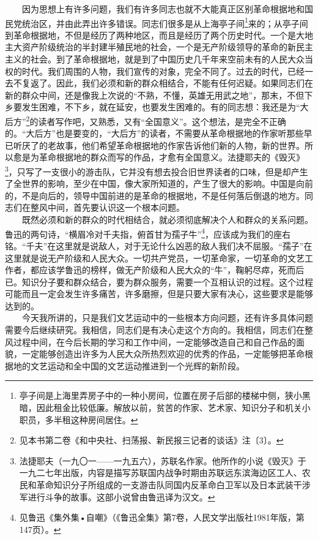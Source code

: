 \documentclass[cn,11pt,chinese]{elegantbook}
\begin{document}
　　因为思想上有许多问题，我们有许多同志也就不大能真正区别革命根据地和国民党统治区，并由此弄出许多错误。同志们很多是从上海亭子间\footnote[11]{ 亭子间是上海里弄房子中的一种小房间，位置在房子后部的楼梯中侧，狭小黑暗，因此租金比较低廉。解放以前，贫苦的作家、艺术家、知识分子和机关小职员，多半租这种房间居住。}来的；从亭子间到革命根据地，不但是经历了两种地区，而且是经历了两个历史时代。一个是大地主大资产阶级统治的半封建半殖民地的社会，一个是无产阶级领导的革命的新民主主义的社会。到了革命根据地，就是到了中国历史几千年来空前未有的人民大众当权的时代。我们周围的人物，我们宣传的对象，完全不同了。过去的时代，已经一去不复返了。因此，我们必须和新的群众相结合，不能有任何迟疑。如果同志们在新的群众中间，还是像我上次说的“不熟，不懂，英雄无用武之地”，那末，不但下乡要发生困难，不下乡，就在延安，也要发生困难的。有的同志想：我还是为“大后方”\footnote[12]{ 见本书第二卷《和中央社、扫荡报、新民报三记者的谈话》注〔3〕。}的读者写作吧，又熟悉，又有“全国意义”。这个想法，是完全不正确的。“大后方”也是要变的，“大后方”的读者，不需要从革命根据地的作家听那些早已听厌了的老故事，他们希望革命根据地的作家告诉他们新的人物，新的世界。所以愈是为革命根据地的群众而写的作品，才愈有全国意义。法捷耶夫的《毁灭》\footnote[13]{ 法捷耶夫（一九〇一——一九五六），苏联名作家。他所作的小说《毁灭》于一九二七年出版，内容是描写苏联国内战争时期由苏联远东滨海边区工人、农民和革命知识分子所组成的一支游击队同国内反革命白卫军以及日本武装干涉军进行斗争的故事。这部小说曾由鲁迅译为汉文。}，只写了一支很小的游击队，它并没有想去投合旧世界读者的口味，但是却产生了全世界的影响，至少在中国，像大家所知道的，产生了很大的影响。中国是向前的，不是向后的，领导中国前进的是革命的根据地，不是任何落后倒退的地方。同志们在整风中间，首先要认识这一个根本问题。\\
　　既然必须和新的群众的时代相结合，就必须彻底解决个人和群众的关系问题。鲁迅的两句诗，“横眉冷对千夫指，俯首甘为孺子牛”\footnote[14]{ 见鲁迅《集外集•自嘲》（《鲁迅全集》第7卷，人民文学出版社1981年版，第147页）。}，应该成为我们的座右铭。“千夫”在这里就是说敌人，对于无论什么凶恶的敌人我们决不屈服。“孺子”在这里就是说无产阶级和人民大众。一切共产党员，一切革命家，一切革命的文艺工作者，都应该学鲁迅的榜样，做无产阶级和人民大众的“牛”，鞠躬尽瘁，死而后已。知识分子要和群众结合，要为群众服务，需要一个互相认识的过程。这个过程可能而且一定会发生许多痛苦，许多磨擦，但是只要大家有决心，这些要求是能够达到的。\\
　　今天我所讲的，只是我们文艺运动中的一些根本方向问题，还有许多具体问题需要今后继续研究。我相信，同志们是有决心走这个方向的。我相信，同志们在整风过程中间，在今后长期的学习和工作中间，一定能够改造自己和自己作品的面貌，一定能够创造出许多为人民大众所热烈欢迎的优秀的作品，一定能够把革命根据地的文艺运动和全中国的文艺运动推进到一个光辉的新阶段。\\
\end{document}
